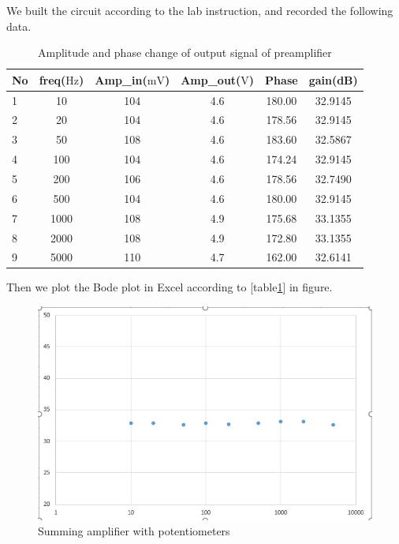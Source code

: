 \hfill \newline
\phantom{ } We built the circuit according to the lab instruction, and recorded the following data.
\begin{table}[!htbp]
	\centering
	\caption{Amplitude and phase change of output signal of preamplifier}
	\begin{tabular}{lccccc}
		\toprule
		No &freq($\si{\hertz}$) &Amp\_in($\si{\milli\volt}$)&Amp\_out($\si{\volt}$)&Phase&gain(dB)\\
		\midrule
		1	&10		&104	&4.6	&180.00	&32.9145\\
		2	&20		&104	&4.6	&178.56	&32.9145\\
		3	&50		&108	&4.6	&183.60	&32.5867\\
		4	&100	&104	&4.6	&174.24	&32.9145\\
		5	&200	&106	&4.6	&178.56	&32.7490\\
		6	&500	&104	&4.6	&180.00	&32.9145\\
		7	&1000	&108	&4.9	&175.68	&33.1355\\
		8	&2000	&108	&4.9	&172.80	&33.1355\\
		9	&5000	&110	&4.7	&162.00	&32.6141\\
		\bottomrule
	\end{tabular}
	\label{tab:preamp}
\end{table}
\phantom{ } Then we plot the Bode plot in Excel according to [table\ref{tab:preamp}] in figure.

\begin{figure}[!htbp]
	\centering 
	\begin{framed}
		\includegraphics[width=\linewidth]{images/1_1.PNG} 
		\caption{Summing amplifier with potentiometers}
		\label{fig:101} 
	\end{framed}
\end{figure} 